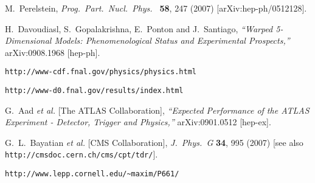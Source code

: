 \documentclass{ws-procs9x6}
\begin{document}
\begin{thebibliography}{99}
  M.~Perelstein,
 {\em Prog.\ Part.\ Nucl.\ Phys.\ } {\bf 58}, 247 (2007)
  [arXiv:hep-ph/0512128].
  
    H.~Davoudiasl, S.~Gopalakrishna, E.~Ponton and J.~Santiago,
{\it ``Warped 5-Dimensional Models: Phenomenological Status and Experimental
  Prospects,''}
  arXiv:0908.1968 [hep-ph].
  
{\tt http://www-cdf.fnal.gov/physics/physics.html}
  
{\tt http://www-d0.fnal.gov/results/index.html}
  
  G.~Aad {\it et al.}  [The ATLAS Collaboration],
{\it ``Expected Performance of the ATLAS Experiment - Detector, Trigger and
  Physics,''}
  arXiv:0901.0512 [hep-ex].

  G.~L.~Bayatian {\it et al.}  [CMS Collaboration],
  {\em J.\ Phys.\ G} {\bf 34}, 995 (2007)
  [see also {\tt http://cmsdoc.cern.ch/cms/cpt/tdr/}].
  
{\tt http://www.lepp.cornell.edu/\~{ }maxim/P661/ }
  
\end{thebibliography}
\end{document}
